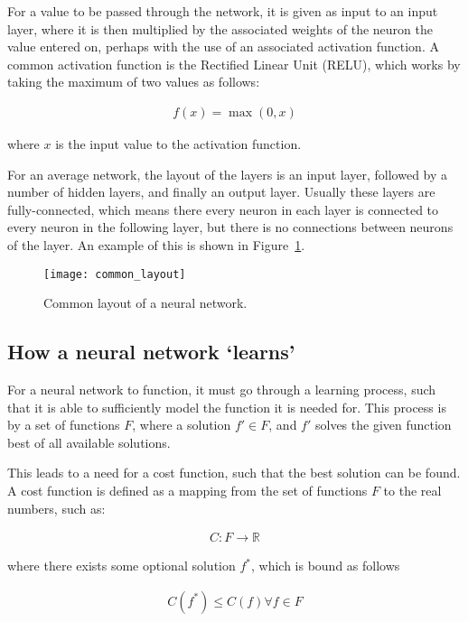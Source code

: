 For a value to be passed through the network, it is given as input to an input
layer, where it is then multiplied by the associated weights of the neuron the
value entered on, perhaps with the use of an associated activation function.  A
common activation function is the Rectified Linear Unit
(RELU)\cite{Nair:2010:RLU:3104322.3104425}, which works by taking the maximum
of two values as follows:

\begin{align}
    f(x) = \max(0, x)
\end{align}

where $x$ is the input value to the activation function.

For an average network, the layout of the layers is an input layer,
followed by a number of hidden layers, and finally an output layer. Usually
these layers are fully-connected, which means there every neuron in each
layer is connected to  every neuron in the following layer, but
there is no connections between neurons of the layer. An example of this
is shown in Figure~\ref{fig:common_layout}.

\begin{figure}
    \centering
    \texttt{[image: common\_layout]}
    \caption{Common layout of a neural network.}%
    \label{fig:common_layout}
\end{figure}

\subsection{How a neural network `learns'}

For a neural network to function, it must go through a learning process, such
that it is able to sufficiently model the function it is needed for. This process
is by a set of functions $F$, where a solution $f' \in F$, and $f'$ solves
the given function best of all available solutions.

This leads to a need for a cost function, such that the best solution can be found.
A cost function is defined as a mapping from the set of functions $F$ to the real
numbers, such as:

\begin{align}
    C : F \rightarrow \mathbb{R}
\end{align}

where there exists some optional solution $f^*$, which is bound as follows

\begin{align}
    C(f^*) \le C(f) \forall f \in F
\end{align}


